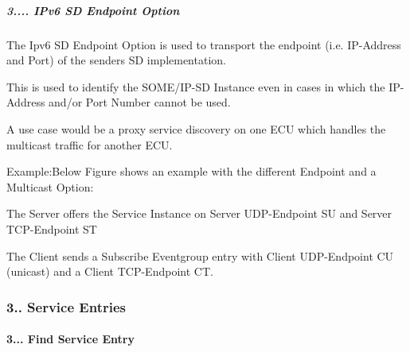 \subparagraph*{3.... I\+Pv6 SD Endpoint Option}


\begin{DoxyItemize}
\item The Ipv6 SD Endpoint Option is used to transport the endpoint (i.\+e. I\+P-\/\+Address and Port) of the senders SD implementation.
\item This is used to identify the S\+O\+M\+E/\+I\+P-\/\+SD Instance even in cases in which the I\+P-\/\+Address and/or Port Number cannot be used.
\item A use case would be a proxy service discovery on one E\+CU which handles the multicast traffic for another E\+CU. 
\item Example\+:Below Figure shows an example with the different Endpoint and a Multicast Option\+:
\item The Server offers the Service Instance on Server U\+D\+P-\/\+Endpoint SU and Server T\+C\+P-\/\+Endpoint ST
\item The Client sends a Subscribe Eventgroup entry with Client U\+D\+P-\/\+Endpoint CU (unicast) and a Client T\+C\+P-\/\+Endpoint CT. 
\end{DoxyItemize}

\subsubsection*{3.. Service Entries}

\paragraph*{3... Find Service Entry}


